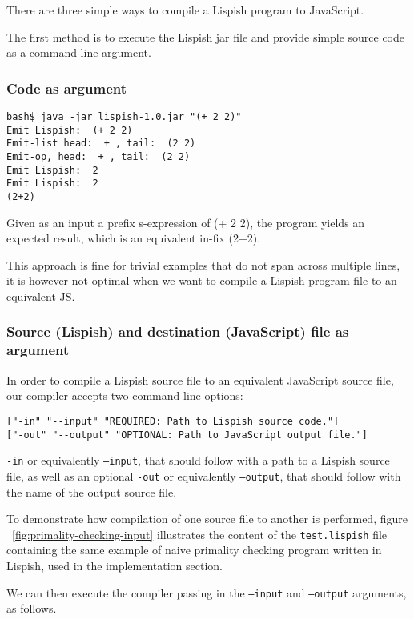 There are three simple ways to compile a Lispish program to JavaScript. 

The first method is to execute the Lispish jar file and provide simple source code as a command line argument.

\subsubsection{Code as argument}

\begin{verbatim}
bash$ java -jar lispish-1.0.jar "(+ 2 2)"
Emit Lispish:  (+ 2 2)
Emit-list head:  + , tail:  (2 2)
Emit-op, head:  + , tail:  (2 2)
Emit Lispish:  2
Emit Lispish:  2
(2+2)
\end{verbatim}

Given as an input a prefix s-expression of (+ 2 2), the program yields an expected result, which is an equivalent in-fix (2+2).

This approach is fine for trivial examples that do not span across multiple lines, it is however not optimal when we want to compile a Lispish program file to an equivalent JS. 

\subsubsection{Source (Lispish) and destination (JavaScript) file as argument}

In order to compile a Lispish source file to an equivalent JavaScript source file, our compiler accepts two command line options:

\begin{verbatim}
["-in" "--input" "REQUIRED: Path to Lispish source code."]
["-out" "--output" "OPTIONAL: Path to JavaScript output file."]
\end{verbatim}

\texttt{-in} or equivalently \texttt{--input}, that should follow with a path to a Lispish source file, as well as an optional 
\texttt{-out} or equivalently \texttt{--output}, that should follow with the name of the output source file. 

To demonstrate how compilation of one source file to another is performed, figure ~\ref{fig:primality-checking-input} illustrates the content of the \texttt{test.lispish} file containing the same example of naive primality checking program written in Lispish, used in the implementation section. 

We can then execute the compiler passing in the \texttt{--input} and \texttt{--output} arguments, as follows.

